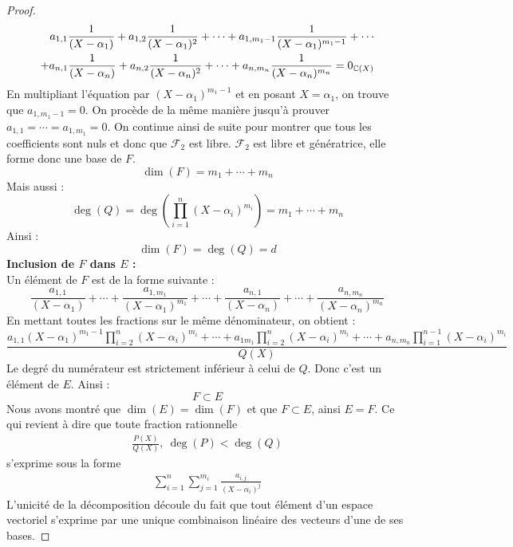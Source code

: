 \begin{proof}
\begin{align*}
        \begin{split}
            a_{1,1} \frac{1}{(X - \alpha_1)} + a_{1,2} \frac{1}{(X - \alpha_1)^2} + \cdots + a_{1,m_1 - 1} \frac{1}{(X - \alpha_1)^{m_1 - 1}} + \cdots \\
            + a_{n,1} \frac{1}{(X - \alpha_n)} + a_{n,2} \frac{1}{(X - \alpha_n)^2} + \cdots + a_{n,m_n} \frac{1}{(X - \alpha_n)^{m_n}} = 0_{\mathbb{C}(X)}
        \end{split}
    \end{align*}
    En multipliant l'équation par $(X - \alpha_1)^{m_1 - 1}$ et en posant $X = \alpha_1$, on trouve que $a_{1,m_1 - 1} = 0$. On procède de la même manière jusqu'à prouver $a_{1,1} = \cdots = a_{1,m_1} = 0$.
    On continue ainsi de suite pour montrer que tous les coefficients sont nuls et donc que $\mathcal{F}_2$ est libre. $\mathcal{F}_2$ est libre et génératrice, elle forme donc une base de $F$.
    \[ \dim(F) = m_1 + \cdots + m_n \]
    Mais aussi : 
    \[ \deg(Q) = \deg \left( \prod_{i=1}^{n} (X - \alpha_i)^{m_i} \right) = m_1 + \cdots + m_n \]
    Ainsi : \[ \dim(F) = \deg(Q) = d \]
    \textbf{Inclusion de $F$ dans $E$ :}
    \\
    Un élément de $F$ est de la forme suivante : 
    \[ \frac{a_{1,1}}{(X - \alpha_1)} + \cdots + \frac{a_{1,m_1}}{(X - \alpha_1)^{m_1}} + \cdots + \frac{a_{n,1}}{(X - \alpha_n)} + \cdots + \frac{a_{n,m_n}}{(X - \alpha_n)^{m_n}} \]
    En mettant toutes les fractions sur le même dénominateur, on obtient :
    \[ \frac{a_{1,1}(X - \alpha_1)^{m_1 - 1} \prod_{i = 2}^{n}(X - \alpha_i)^{m_i} + \cdots + a_{1m_1} \prod_{i = 2}^{n}(X - \alpha_i)^{m_i} + \cdots + a_{n,m_n} \prod_{i = 1}^{n - 1}(X - \alpha_i)^{m_i}}{Q(X)} \]
    Le degré du numérateur est strictement inférieur à celui de $Q$. Donc c'est un élément de $E$. Ainsi :
    \[ F \subset E \]
    Nous avons montré que $\dim(E) = \dim(F)$ et que $F \subset E$, ainsi $E = F$.
    Ce qui revient à dire que toute fraction rationnelle 
    \begin{align*}
        \frac{P(X)}{Q(X)},\ \deg(P) < \deg(Q)
    \end{align*}
    s'exprime sous la forme 
    \begin{align*}
        \sum_{i=1}^n \sum_{j = 1}^{m_i} \frac{a_{i,j}}{(X - \alpha_i)^j}
    \end{align*}
    L'unicité de la décomposition découle du fait que tout élément d'un espace vectoriel s'exprime par une unique combinaison linéaire des vecteurs d'une de ses bases.
\end{proof}

